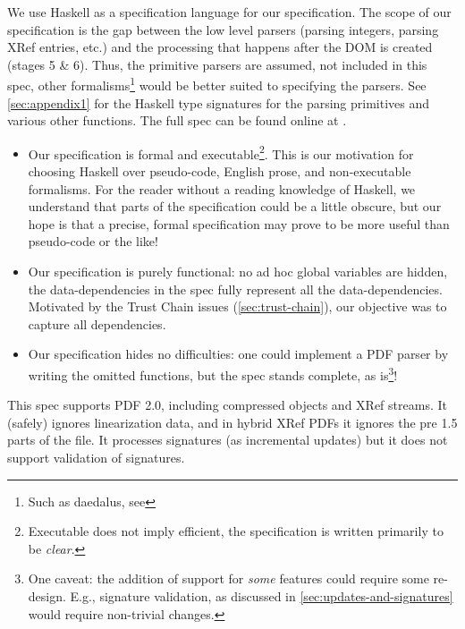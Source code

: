 We use Haskell \cite{Haskell} as a specification language for
our specification.
%
The scope of our specification is the gap between the low
level parsers (parsing integers, parsing XRef entries, etc.) and the
processing that happens after the DOM is created (stages 5 \& 6).
%
Thus, the primitive parsers are assumed, not included in this spec,
other formalisms\footnote{Such as daedalus, see \todo{}
} would be better suited to specifying the parsers.
See \cref{sec:appendix1} for the Haskell type signatures for the
parsing primitives and various other functions.
%
The full spec can be found online at .

\begin{itemize}
\item Our specification is formal and executable\footnote{
  Executable does not imply efficient, the specification is written
  primarily to be \emph{clear}.}.
  This is our motivation for choosing Haskell over pseudo-code,
  English prose, and non-executable formalisms.  For the reader
  without a reading knowledge of Haskell, we understand that parts of
  the specification could be a little obscure, but our hope is that a
  precise, formal specification may prove to be more useful than
  pseudo-code or the like!
  
\item Our specification is purely functional: no ad hoc global variables are
  hidden, the data-dependencies in the spec fully represent all the
  data-dependencies.  Motivated by the Trust Chain issues
  (\cref{sec:trust-chain}), our objective was to capture all dependencies.
  
\item Our specification hides no difficulties: one could implement a PDF parser
  by writing the omitted functions, but the spec stands complete, as
  is\footnote{One caveat: the addition of support for \emph{some} features
  could require some re-design.  E.g., signature validation, as discussed in
  \cref{sec:updates-and-signatures} would require non-trivial changes.
  }!
\end{itemize}


This spec supports PDF 2.0, including compressed objects and XRef streams.
%
It (safely) ignores linearization data, and in hybrid XRef PDFs
it ignores the pre 1.5 parts of the file.
It processes signatures (as incremental updates) but it does not support
validation of signatures.

